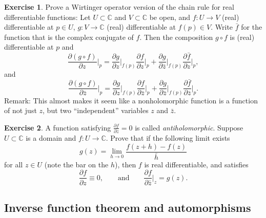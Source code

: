 \documentclass[12pt,openany]{book}
\newcommand{\C}{{\mathbb{C}}}
\newcommand{\myindex}[1]{#1\index{#1}}
\theoremstyle{plain}
\theoremstyle{remark}
\theoremstyle{definition}
\newenvironment{exbox}{%
    \def\FrameCommand{\vrule width 1pt \relax\hspace{10pt}}%
    \MakeFramed{\advance\hsize-\width\FrameRestore}%
}{%
    \endMakeFramed
}
\theoremstyle{exercise}
\newtheorem{exercise}{Exercise}[section]
\theoremstyle{example}
\begin{document}
\begin{exbox}
\begin{exercise} \label{exercise:wirtingerchain}
Prove a Wirtinger operator version of
the chain rule
for real differentiable
functions:  Let $U \subset \C$ and $V \subset \C$ be open, and $f \colon U \to V$
(real) differentiable at $p \in U$, $g \colon V \to \C$ (real) differentiable
at $f(p) \in V$.  Write $\bar{f}$ for the function that is the complex conjugate
of $f$.  Then the composition $g \circ f$
is (real) differentiable at $p$ and
\begin{equation*}
\frac{\partial (g \circ f)}{\partial z}\Big|_p
=
\frac{\partial g}{\partial z}\Big|_{f(p)}
\frac{\partial f}{\partial z}\Big|_p
+
\frac{\partial g}{\partial \bar{z}}\Big|_{f(p)}
\frac{\partial \bar{f}}{\partial z}\Big|_p ,
\end{equation*}
and
\begin{equation*}
\frac{\partial (g \circ f)}{\partial \bar{z}}\Big|_p
=
\frac{\partial g}{\partial z}\Big|_{f(p)}
\frac{\partial f}{\partial \bar{z}}\Big|_p
+
\frac{\partial g}{\partial \bar{z}}\Big|_{f(p)}
\frac{\partial \bar{f}}{\partial \bar{z}}\Big|_p .
\end{equation*}
Remark: This almost makes it seem like a nonholomorphic function is a
function of not just $z$, but two ``independent'' variables $z$ and
$\bar{z}$.
\end{exercise}

\begin{exercise}
A function satisfying $\frac{\partial f}{\partial z} = 0$ is called
\emph{\myindex{antiholomorphic}}.
Suppose $U \subset \C$ is a domain and $f \colon U \to \C$.
Prove that if the following
limit exists
\begin{equation*}
g(z) = 
\lim_{h \to 0}
\frac{f(z+h)-f(z)}{\bar{h}}
\end{equation*}
for all $z \in U$ (note the bar on the $h$), then $f$ is real differentiable, and satisfies
\begin{equation*}
\frac{\partial f}{\partial z} \equiv 0, \qquad \text{and} \qquad
\frac{\partial f}{\partial \bar{z}}\Big|_{z} = g(z).
\end{equation*}
\end{exercise}
\end{exbox}

\subsection{Inverse function theorem and automorphisms}
\end{document}
